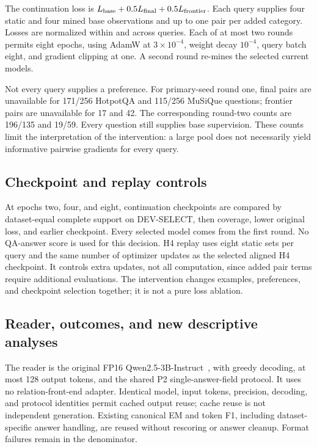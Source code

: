 \documentclass[preprint,12pt]{elsarticle}
\begin{document}
The continuation loss is $L_{\rm base}+0.5L_{\rm final}+0.5L_{\rm frontier}$. Each query supplies four static and four mined base observations and up to one pair per added category. Losses are normalized within and across queries. Each of at most two rounds permits eight epochs, using AdamW at $3\times10^{-4}$, weight decay $10^{-4}$, query batch eight, and gradient clipping at one. A second round re-mines the selected current models.

Not every query supplies a preference. For primary-seed round one, final pairs are unavailable for 171/256 HotpotQA and 115/256 MuSiQue questions; frontier pairs are unavailable for 17 and 42. The corresponding round-two counts are 196/135 and 19/59. Every question still supplies base supervision. These counts limit the interpretation of the intervention: a large pool does not necessarily yield informative pairwise gradients for every query.

\subsection{Checkpoint and replay controls}
At epochs two, four, and eight, continuation checkpoints are compared by dataset-equal complete support on DEV-SELECT, then coverage, lower original loss, and earlier checkpoint. Every selected model comes from the first round. No QA-answer score is used for this decision. H4 replay uses eight static sets per query and the same number of optimizer updates as the selected aligned H4 checkpoint. It controls extra updates, not all computation, since added pair terms require additional evaluations. The intervention changes examples, preferences, and checkpoint selection together; it is not a pure loss ablation.

\subsection{Reader, outcomes, and new descriptive analyses}
The reader is the original FP16 Qwen2.5-3B-Instruct~\cite{qwen2024release}, with greedy decoding, at most 128 output tokens, and the shared P2 single-answer-field protocol. It uses no relation-front-end adapter. Identical model, input tokens, precision, decoding, and protocol identities permit cached output reuse; cache reuse is not independent generation. Existing canonical EM and token F1, including dataset-specific answer handling, are reused without rescoring or answer cleanup. Format failures remain in the denominator.
\end{document}
